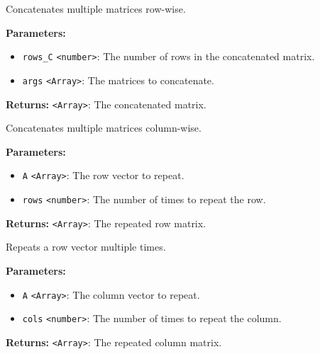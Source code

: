\documentclass[12pt,a4paper]{article}
\begin{document}
\noindent Concatenates multiple matrices row-wise.

\vspace{5mm}
\noindent {}


\noindent \textbf{Parameters:}
\begin{itemize}
  \item \texttt{rows\_C} \texttt{<number>}: The number of rows in the concatenated matrix.
  \item \texttt{args} \texttt{<Array>}: The matrices to concatenate.
\end{itemize}

\noindent \textbf{Returns:} \texttt{<Array>}: The concatenated matrix.

\noindent Concatenates multiple matrices column-wise.

\vspace{5mm}
\noindent {}


\noindent \textbf{Parameters:}
\begin{itemize}
  \item \texttt{A} \texttt{<Array>}: The row vector to repeat.
  \item \texttt{rows} \texttt{<number>}: The number of times to repeat the row.
\end{itemize}

\noindent \textbf{Returns:} \texttt{<Array>}: The repeated row matrix.

\noindent Repeats a row vector multiple times.

\vspace{5mm}
\noindent {}


\noindent \textbf{Parameters:}
\begin{itemize}
  \item \texttt{A} \texttt{<Array>}: The column vector to repeat.
  \item \texttt{cols} \texttt{<number>}: The number of times to repeat the column.
\end{itemize}

\noindent \textbf{Returns:} \texttt{<Array>}: The repeated column matrix.
\end{document}
